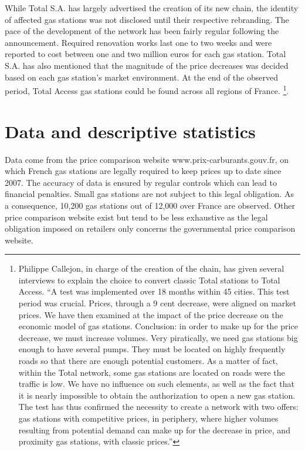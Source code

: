 \documentclass[english]{article}
\begin{document}
While Total S.A. has largely advertised the creation of its new chain, the identity of affected gas stations was not disclosed until their respective rebranding. The pace of the development of the network has been fairly regular following the announcement. Required renovation works last one to two weeks and were reported to cost between one and two million euros for each gas station. Total S.A. has also mentioned that the magnitude of the price decreases was decided based on each gas station's market environment. At the end of the observed period, Total Access gas stations could be found across all regions of France.%
\footnote{Philippe Callejon, in charge of the creation of the chain, has given several interviews to explain the choice to convert classic Total stations to Total Access. ``A test was implemented over 18 months within 45 cities. This test period was crucial. Prices, through a 9 cent decrease, were aligned on market prices. We have then examined at the impact of the price decrease on the economic model of gas stations. Conclusion: in order to make up for the price decrease, we must increase volumes. Very piratically, we need gas stations big enough to have several pumps. They must be located on highly frequently roads so that there are enough potential customers. As a matter of fact, within the Total network, some gas stations are located on roads were the traffic is low. We have no influence on such elements, as well as the fact that it is nearly impossible to obtain the authorization to open a new gas station. The test has thus confirmed the necessity to create a network with two offers: gas stations with competitive prices, in periphery, where higher volumes resulting from potential demand can make up for the decrease in price, and proximity gas stations, with classic prices.''%
}.

\section{Data and descriptive statistics}

Data come from the price comparison website www.prix-carburants.gouv.fr, on which French gas stations are legally required to keep prices up to date since 2007. The accuracy of data is ensured by regular controls which can lead to financial penalties. Small gas stations are not subject to this legal obligation. As a consequence, 10,200 gas stations out of 12,000 over France are observed. Other price comparison website exist but tend to be less exhaustive as the legal obligation imposed on retailers only concerns the governmental price comparison website. \medskip{}
\end{document}
